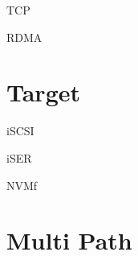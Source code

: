 \begin{enumbox}
\item TCP
\item RDMA
\end{enumbox}

\section{Target}

\begin{enumbox}
\item iSCSI
\item iSER
\item NVMf
\end{enumbox}

\section{Multi Path}
